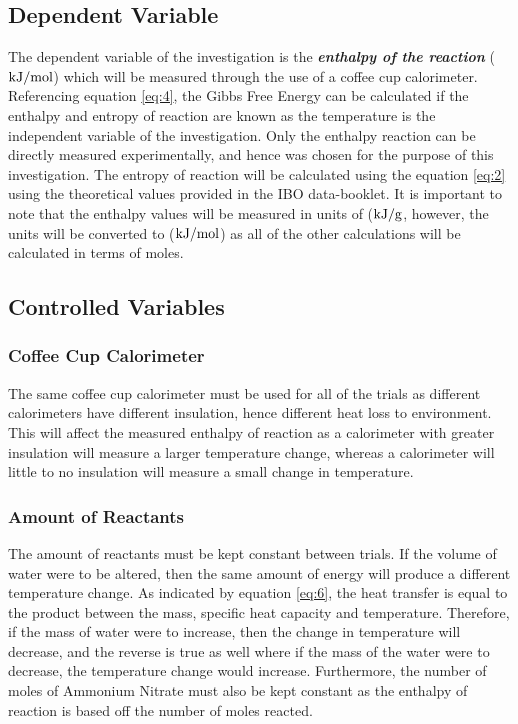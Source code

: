 \documentclass{article}
\begin{document}
\subsection{Dependent Variable}
The dependent variable of the investigation is the \textbf{\textit{enthalpy of the reaction }}($\ce{kJ/mol}$) which will be measured through the use of a coffee cup calorimeter. Referencing equation \ref{eq:4}, the Gibbs Free Energy can be calculated if the enthalpy and entropy of reaction are known as the temperature is the independent variable of the investigation. Only the enthalpy reaction can be directly measured experimentally, and hence was chosen for the purpose of this investigation. The entropy of reaction will be calculated using the equation \ref{eq:2} using the theoretical values provided in the IBO data-booklet. It is important to note that the enthalpy values will be measured in units of ($\ce{kJ/g}$, however, the units will be converted to ($\ce{kJ/mol}$) as all of the other calculations will be calculated in terms of moles.

\subsection{Controlled Variables}
\subsubsection{Coffee Cup Calorimeter}
The same coffee cup calorimeter must be used for all of the trials as different calorimeters have different insulation, hence different heat loss to environment. This will affect the measured enthalpy of reaction as a calorimeter with greater insulation will measure a larger temperature change, whereas a calorimeter will little to no insulation will measure a small change in temperature.

\subsubsection{Amount of Reactants}
The amount of reactants must be kept constant between trials. If the volume of water were to be altered, then the same amount of energy will produce a different temperature change. As indicated by equation \ref{eq:6}, the heat transfer is equal to the product between the mass, specific heat capacity and temperature. Therefore, if the mass of water were to increase, then the change in temperature will decrease, and the reverse is true as well where if the mass of the water were to decrease, the temperature change would increase. Furthermore, the number of moles of Ammonium Nitrate must also be kept constant as the enthalpy of reaction is based off the number of moles reacted.
\end{document}
